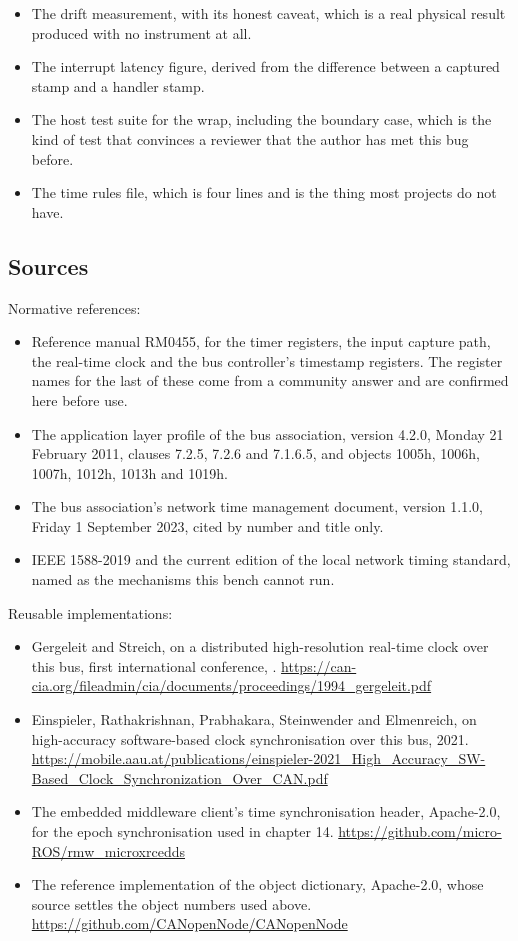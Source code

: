 \begin{itemize}
\item The drift measurement, with its honest caveat, which is a real physical
result produced with no instrument at all.
\item The interrupt latency figure, derived from the difference between a
captured stamp and a handler stamp.
\item The host test suite for the wrap, including the boundary case, which is
the kind of test that convinces a reviewer that the author has met this bug
before.
\item The time rules file, which is four lines and is the thing most projects do
not have.
\end{itemize}

\subsection*{Sources}

Normative references:
\begin{itemize}
\item Reference manual RM0455, for the timer registers, the input capture path,
the real-time clock and the bus controller's timestamp registers. The register
names for the last of these come from a community answer and are confirmed here
before use.
\item The application layer profile of the bus association, version 4.2.0,
Monday 21 February 2011, clauses 7.2.5, 7.2.6 and 7.1.6.5, and objects 1005h,
1006h, 1007h, 1012h, 1013h and 1019h.
\item The bus association's network time management document, version 1.1.0,
Friday 1 September 2023, cited by number and title only.
\item IEEE 1588-2019 and the current edition of the local network timing
standard, named as the mechanisms this bench cannot run.
\end{itemize}

Reusable implementations:
\begin{itemize}
\item Gergeleit and Streich, on a distributed high-resolution real-time clock
over this bus, first international conference, .\newline
\url{https://can-cia.org/fileadmin/cia/documents/proceedings/1994_gergeleit.pdf}
\item Einspieler, Rathakrishnan, Prabhakara, Steinwender and Elmenreich, on
high-accuracy software-based clock synchronisation over this bus, 2021.\newline
\url{https://mobile.aau.at/publications/einspieler-2021_High_Accuracy_SW-Based_Clock_Synchronization_Over_CAN.pdf}
\item The embedded middleware client's time synchronisation header,
Apache-2.0, for the epoch synchronisation used in chapter 14.\newline
\url{https://github.com/micro-ROS/rmw_microxrcedds}
\item The reference implementation of the object dictionary, Apache-2.0, whose
source settles the object numbers used above.\newline
\url{https://github.com/CANopenNode/CANopenNode}
\end{itemize}
